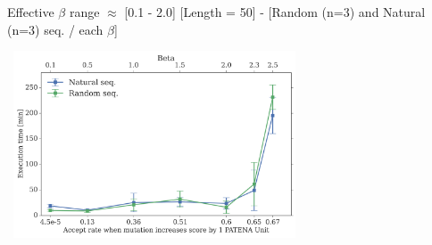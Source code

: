 \documentclass{beamer}
\begin{document}
\begin{frame}[plain]{Effective $\beta$ range $\approx$ [0.1 - 2.0]}
\centering
[Length = 50] - [Random (n=3) and Natural (n=3) seq. / each $\beta$] \\
\begin{adjustwidth}{-1.5em}{-2.5em}
\includegraphics[width=330px,height=210px]{../img/beta-vs-time-length50-300dpi.png} 
\end{adjustwidth}
\end{frame}
\end{document}
